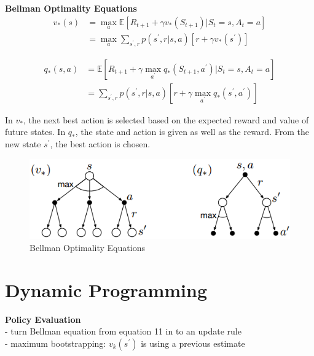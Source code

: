 \documentclass{article}
\begin{document}
\newpage
\noindent
\textbf{Bellman Optimality Equations}\\

\begin{equation}
\begin{aligned}
v_{*}(s) & = \max _{a} \mathbb{E}\left[R_{t+1}+\gamma v_{*}\left(S_{t+1}\right) | S_{t}=s, A_{t}=a\right]\\
&= \max _{a} \sum_{s^{\prime}, r} p\left(s^{\prime}, r | s, a\right)\left[r+\gamma v_{*}\left(s^{\prime}\right)\right]
\end{aligned}
\end{equation}

\begin{equation}
\begin{aligned}
q_{*}(s, a)&=\mathbb{E}\left[R_{t+1}+\gamma \max _{a^{\prime}} q_{*}\left(S_{t+1}, a^{\prime}\right) | S_{t}=s, A_{t}=a\right] \\
&=\sum_{s^{\prime}, r} p\left(s^{\prime}, r | s, a\right)\left[r+\gamma \max _{a^{\prime}} q_{*}\left(s^{\prime}, a^{\prime}\right)\right]
\end{aligned}
\end{equation}

\noindent
In $v_{*}$, the next best action is selected based on the expected reward and
value of future states. In $q_{*}$, the state and action is given as well as the
reward. From the new state $s^{\prime}$, the best action is chosen.

\begin{figure}[h]
\includegraphics[scale=0.5]{bellman_optimality}
\centering
\caption{Bellman Optimality Equations}
\end{figure}

\noindent
\section{Dynamic Programming}

\noindent
\textbf{Policy Evaluation}\\
- turn Bellman equation from equation 11 in to an update rule\\
- maximum bootstrapping: $v_{k}(s^{\prime})$ is using a previous estimate
\end{document}

